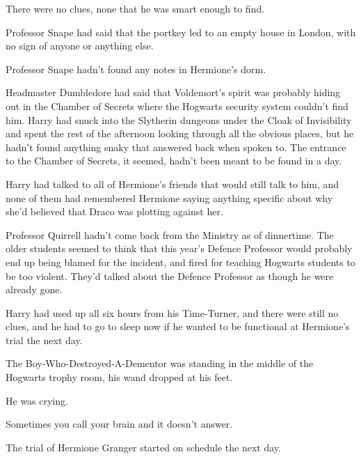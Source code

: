 There were no clues, none that he was smart enough to find.

Professor Snape had said that the portkey led to an empty house in
London, with no sign of anyone or anything else.

Professor Snape hadn't found any notes in Hermione's dorm.

Headmaster Dumbledore had said that Voldemort's spirit was probably
hiding out in the Chamber of Secrets where the Hogwarts security system
couldn't find him. Harry had snuck into the Slytherin dungeons under the
Cloak of Invisibility and spent the rest of the afternoon looking
through all the obvious places, but he hadn't found anything snaky that
answered back when spoken to. The entrance to the Chamber of Secrets, it
seemed, hadn't been meant to be found in a day.

Harry had talked to all of Hermione's friends that would still talk to
him, and none of them had remembered Hermione saying anything specific
about why she'd believed that Draco was plotting against her.

Professor Quirrell hadn't come back from the Ministry as of dinnertime.
The older students seemed to think that this year's Defence Professor
would probably end up being blamed for the incident, and fired for
teaching Hogwarts students to be too violent. They'd talked about the
Defence Professor as though he were already gone.

Harry had used up all six hours from his Time-Turner, and there were
still no clues, and he had to go to sleep now if he wanted to be
functional at Hermione's trial the next day.

The Boy-Who-Destroyed-A-Dementor was standing in the middle of the
Hogwarts trophy room, his wand dropped at his feet.

He was crying.

Sometimes you call your brain and it doesn't answer.

The trial of Hermione Granger started on schedule the next day.
